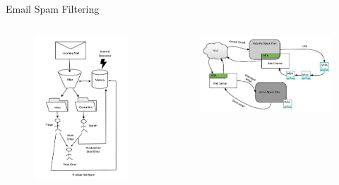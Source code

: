 \documentclass[nobackground,dvipsnames,table,aspectratio=169]{beamer}
\begin{document}
\begin{frame}{Email Spam Filtering}
    \begin{columns}
            \begin{figure}
                \centering
                \includegraphics[width=\textwidth]{client-side-filter}
            \end{figure}
            \begin{figure}
                \centering
                \includegraphics[width=\textwidth]{enterprise-side-filter}

\end{figure}
\end{columns}
\end{frame}
\end{document}
